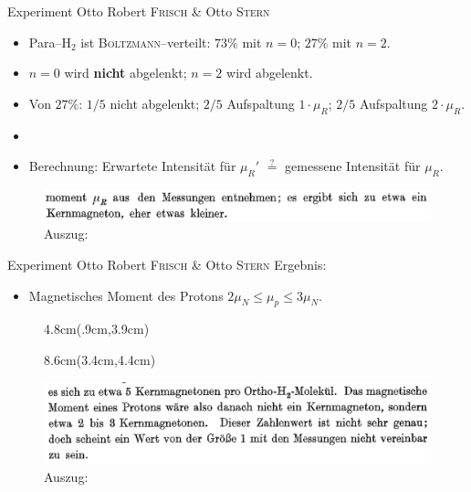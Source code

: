 \documentclass[t,9pt]{beamer}
\newcommand{\highlight}[3]{ \begin{textblock*}{#1}(#2,#3) \begin{tcolorbox} [enhanced,opacityfill=.1,colback=blue] \end{tcolorbox} \end{textblock*} } %
\begin{document}
        \begin{frame}{Experiment Otto Robert \textsc{Frisch} \& Otto \textsc{Stern}}
                \begin{itemize}
                        \item Para--$\text{H}_2$ ist \textsc{Boltzmann}--verteilt: $73\%$ mit $n=0$; $27\%$ mit $n=2$.
                        \item $n=0$ wird \textbf{nicht} abgelenkt; $n=2$ wird abgelenkt.
                        \item Von $27\%$: $1/5$ nicht abgelenkt; $2/5$ Aufspaltung $1\cdot \mu _R$; $2/5$ Aufspaltung $2\cdot \mu _R$.
                                \pause
                        \item[]
                        \item Berechnung: Erwartete Intensität für $\mu _R'$ $\stackrel{?}{=}$ gemessene Intensität für $\mu _R$.
                \end{itemize}
                \begin{figure}
                        \centering
                        \includegraphics[width=\textwidth]{prosi_ergebnis_rotationsmoment.png}
                        \caption{Auszug:\cite{FrischStern1933}}
                \end{figure}
        \end{frame}

        \begin{frame}{Experiment Otto Robert \textsc{Frisch} \& Otto \textsc{Stern}}
                Ergebnis:
                \begin{itemize}
                        \item Magnetisches Moment des Protons $2\mu _N\leq \mu _p\leq 3\mu _N$.
                \end{itemize}
                \begin{figure}
                        \highlight{4.8cm}{.9cm}{3.9cm}
                        \highlight{8.6cm}{3.4cm}{4.4cm}
                        \includegraphics[width=.9\textwidth]{prosi_mag_moment_proton_nicht_1.png}
                        \caption{Auszug:\cite{FrischStern1933}}
                \end{figure}
        \end{frame}
\end{document}

